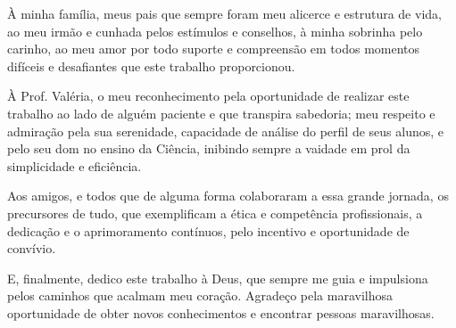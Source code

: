 À minha família, meus pais que sempre foram meu alicerce e estrutura de vida, ao meu irmão e cunhada pelos estímulos e conselhos, à minha sobrinha pelo carinho, ao meu amor por todo suporte e compreensão em todos momentos difíceis e desafiantes que este trabalho proporcionou.

À Prof. Valéria, o meu reconhecimento pela oportunidade de realizar este trabalho ao lado de alguém paciente e que transpira sabedoria; meu respeito e admiração pela sua serenidade, capacidade de análise do perfil de seus alunos, e pelo seu dom no ensino da Ciência, inibindo sempre a vaidade em prol da simplicidade e eficiência.

Aos amigos, e todos que de alguma forma colaboraram a essa grande jornada, os precursores de tudo, que exemplificam a ética e competência profissionais, a dedicação e o aprimoramento contínuos, pelo incentivo e oportunidade de convívio.

E, finalmente, dedico este trabalho à Deus, que sempre me guia e impulsiona pelos caminhos que acalmam meu coração. Agradeço pela maravilhosa oportunidade de obter novos conhecimentos e encontrar pessoas maravilhosas.